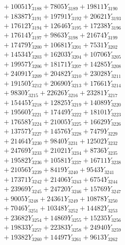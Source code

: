 \documentclass[a4paper,10pt]{article}
\begin{document}
{\begin{align}
&\;  + 10051 Y_{3188} + 7805 Y_{3189} + 19811 Y_{3190} \\[0.3ex]
&\;  + 18387 Y_{3191} + 19791 Y_{3192} + 20621 Y_{3193} \\[0.3ex]
&\;  + 17612 Y_{3194} + 12646 Y_{3195} + 17238 Y_{3196} \\[0.3ex]
&\;  + 17614 Y_{3197} + 9863 Y_{3198} + 21674 Y_{3199} \\[0.3ex]
&\;  + 17479 Y_{3200} + 10681 Y_{3201} + 7531 Y_{3202} \\[0.3ex]
&\;  + 14534 Y_{3203} + 16203 Y_{3204} + 10706 Y_{3205} \\[0.3ex]
&\;  + 19957 Y_{3206} + 18171 Y_{3207} + 14285 Y_{3208} \\[0.5ex]\allowbreak
&\;  + 24091 Y_{3209} + 20482 Y_{3210} + 23028 Y_{3211} \\[0.3ex]
&\;  + 19150 Y_{3212} + 20690 Y_{3213} + 17661 Y_{3214} \\[0.3ex]
&\;  + 9830 Y_{3215} + 22626 Y_{3216} + 23281 Y_{3217} \\[0.3ex]
&\;  + 15445 Y_{3218} + 12825 Y_{3219} + 14089 Y_{3220} \\[0.3ex]
&\;  + 19560 Y_{3221} + 17449 Y_{3222} + 18101 Y_{3223} \\[0.3ex]
&\;  + 17658 Y_{3224} + 21005 Y_{3225} + 16629 Y_{3226} \\[0.3ex]
&\;  + 13757 Y_{3227} + 14576 Y_{3228} + 7479 Y_{3229} \\[0.3ex]
&\;  + 21464 Y_{3230} + 9840 Y_{3231} + 12502 Y_{3232} \\[0.3ex]
&\;  + 24769 Y_{3233} + 21021 Y_{3234} + 8736 Y_{3235} \\[0.3ex]
&\;  + 19582 Y_{3236} + 10581 Y_{3237} + 16711 Y_{3238} \\[0.5ex]\allowbreak
&\;  + 21056 Y_{3239} + 8419 Y_{3240} + 9543 Y_{3241} \\[0.3ex]
&\;  + 17371 Y_{3242} + 21406 Y_{3243} + 6754 Y_{3244} \\[0.3ex]
&\;  + 23969 Y_{3245} + 24720 Y_{3246} + 15769 Y_{3247} \\[0.3ex]
&\;  + 9005 Y_{3248} + 24361 Y_{3249} + 10878 Y_{3250} \\[0.3ex]
&\;  + 7046 Y_{3251} + 10348 Y_{3252} + 14482 Y_{3253} \\[0.3ex]
&\;  + 23682 Y_{3254} + 14869 Y_{3255} + 15235 Y_{3256} \\[0.3ex]
&\;  + 19833 Y_{3257} + 22383 Y_{3258} + 24940 Y_{3259} \\[0.3ex]
&\;  + 19382 Y_{3260} + 14497 Y_{3261} + 9613 Y_{3262} \\[0.3ex]

\end{align}}
\end{document}
